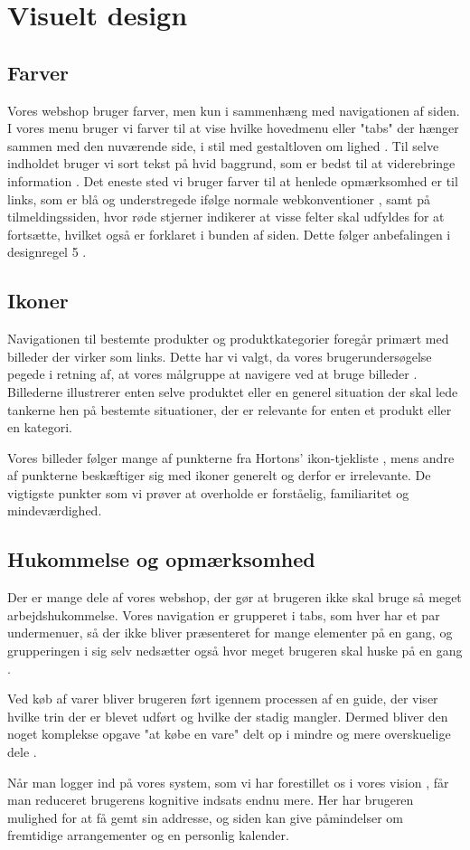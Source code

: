 \chapter{Visuelt design}

\section{Farver}
Vores webshop bruger farver, men kun i sammenhæng med navigationen af siden. I vores menu bruger vi farver til at vise hvilke hovedmenu eller "tabs"
der hænger sammen med den nuværende side, i stil med gestaltloven om lighed \cite[s. 336]{Benyon2010}. Til selve indholdet bruger vi sort tekst
på hvid baggrund, som er bedst til at viderebringe information \cite[s. 430]{marcus}. Det eneste sted vi bruger farver til at henlede opmærksomhed er
til links, som er blå og understregede ifølge normale webkonventioner \cite[s. 385]{Benyon2010}, samt på tilmeldingssiden, hvor røde stjerner indikerer at visse felter skal udfyldes for at fortsætte, hvilket også er forklaret i bunden af siden. Dette følger anbefalingen i designregel 5 \cite[s. 344]{Benyon2010}.

\section{Ikoner}
Navigationen til bestemte produkter og produktkategorier foregår primært med billeder der virker som links. Dette har vi valgt, da vores brugerundersøgelse
pegede i retning af, at vores målgruppe at navigere ved at bruge billeder \cite{os}. Billederne illustrerer enten selve produktet eller en generel situation
der skal lede tankerne hen på bestemte situationer, der er relevante for enten et produkt eller en kategori. 

Vores billeder følger mange af punkterne fra Hortons' ikon-tjekliste \cite[s. 327]{Benyon2010}, mens andre af punkterne beskæftiger sig med ikoner generelt
og derfor er irrelevante. De vigtigste punkter som vi prøver at overholde er forståelig, familiaritet og mindeværdighed. 

\section{Hukommelse og opmærksomhed}
Der er mange dele af vores webshop, der gør at brugeren ikke skal bruge så meget arbejdshukommelse. Vores navigation er grupperet i tabs, som hver har et par
undermenuer, så der ikke bliver præsenteret for mange elementer på en gang, og grupperingen i sig selv nedsætter også hvor meget brugeren skal huske på en gang
\cite[s. 339]{Benyon2010}.

Ved køb af varer bliver brugeren ført igennem processen af en guide, der viser hvilke trin der er blevet udført og hvilke der stadig mangler. Dermed bliver den noget komplekse opgave "at købe en vare" delt op i mindre og mere overskuelige dele \cite[s. 333]{Beynon2010}.

Når man logger ind på vores system, som vi har forestillet os i vores vision \cite{osos}, får man reduceret brugerens kognitive indsats endnu mere. Her har brugeren mulighed for at få gemt sin addresse, og siden kan give påmindelser om fremtidige arrangementer og en personlig kalender.
